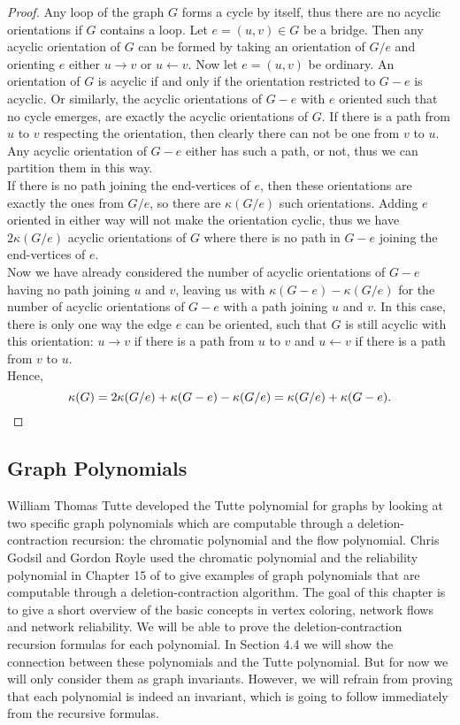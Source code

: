 \documentclass[12pt,a4paper, twoside, autooneside=false]{scrartcl}
\theoremstyle{definition}
\theoremstyle{remark}
\numberwithin{equation}{section}
\begin{document}
\begin{proof}
Any loop of the graph $G$ forms a cycle by itself, thus there are no acyclic orientations if $G$ contains a loop. Let $e = (u,v) \in G$ be a bridge. Then any acyclic orientation of $G$ can be formed by taking an orientation of $G / e$ and orienting $e$ either $ u \to v$ or $u \leftarrow v$. Now let $e = (u,v)$ be ordinary. An orientation of $G$ is acyclic if and only if the orientation restricted to $G - e$ is acyclic. Or similarly, the acyclic orientations of $G - e$ with $e$ oriented such that no cycle emerges, are exactly the acyclic orientations of $G$. If there is a path from $u$ to $v$ respecting the orientation, then clearly there can not be one from $v$ to $u$. Any acyclic orientation of $G - e$ either has such a path, or not, thus we can partition them in this way. \\
\indent If there is no path joining the end-vertices of $e$, then these orientations are exactly the ones from $G / e$, so there are $\kappa(G / e)$ such orientations. Adding $e$ oriented in either way will not make the orientation cyclic, thus we have $2 \kappa(G / e)$ acyclic orientations of $G$ where there is no path in $G - e$ joining the end-vertices of $e$. \\
Now we have already considered the number of acyclic orientations of $G - e$ having no path joining $u$ and $v$, leaving us with $\kappa(G - e) - \kappa (G / e)$ for the number of acyclic orientations of $G - e$ with a path joining $u$ and $v$. In this case, there is only one way the edge $e$ can be oriented, such that $G$ is still acyclic with this orientation: $u \rightarrow v$ if there is a path from $u$ to $v$ and $u \leftarrow v$ if there is a path from $v$ to $u$. \\ 
Hence,
\[
\kappa(G) = 2 \kappa(G / e) + \kappa(G - e) - \kappa(G / e) = \kappa (G / e) + \kappa (G - e). \qedhere
\]
\end{proof}
\subsection{Graph Polynomials}
William Thomas Tutte developed the Tutte polynomial for graphs by looking at two specific graph polynomials which are computable through a deletion-contraction recursion: the chromatic polynomial and the flow polynomial. Chris Godsil and Gordon Royle used the chromatic polynomial and the reliability polynomial in Chapter 15 of \cite{GoRo2001} to give examples of graph polynomials that are computable through a deletion-contraction algorithm. The goal of this chapter is to give a short overview of the basic concepts in vertex coloring, network flows and network reliability. We will be able to prove the deletion-contraction recursion formulas for each polynomial. In Section 4.4 we will show the connection between these polynomials and the Tutte polynomial. But for now we will only consider them as graph invariants. However, we will refrain from proving that each polynomial is indeed an invariant, which is going to follow immediately from the recursive formulas.
\end{document}
